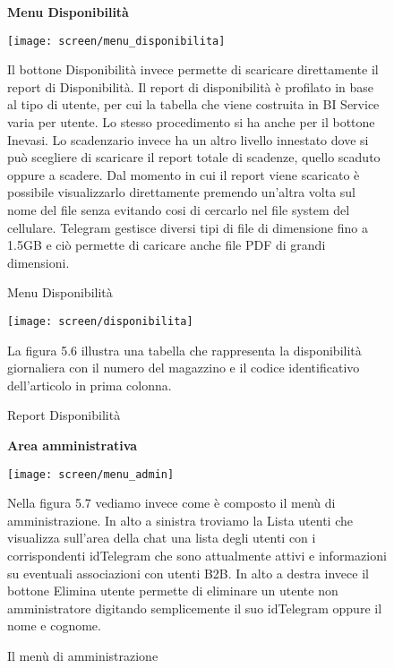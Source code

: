 \begin{figure}[h!]
\begin{center}
\textbf{Menu Disponibilità}
\end{center}
\begin{center}
    \texttt{[image: screen/menu\_disponibilita]} 
    \caption{Menu Disponibilità}
     \end{center}
    Il bottone Disponibilità invece permette di scaricare direttamente il report di Disponibilità. Il report di disponibilità è profilato in base al tipo di utente, per cui la tabella che viene costruita in BI Service varia per utente. Lo stesso procedimento si ha anche per il bottone Inevasi. Lo scadenzario invece ha un altro livello innestato dove si può scegliere di scaricare il report totale di scadenze, quello scaduto oppure a scadere. Dal momento in cui il report viene scaricato è possibile visualizzarlo direttamente premendo un'altra volta sul nome del file senza evitando cosi di cercarlo nel file system del cellulare. Telegram gestisce diversi tipi di file di dimensione fino a 1.5GB e ciò permette di caricare anche file PDF di grandi dimensioni. 
\end{figure}  


\begin{figure}[h!]
   
    \texttt{[image: screen/disponibilita]} 
    \caption{Report Disponibilità}
     La figura 5.6 illustra una tabella che rappresenta la disponibilità giornaliera con il numero del magazzino e il codice identificativo dell’articolo in prima colonna.
\end{figure}  


\begin{figure}[h!]
   \begin{center}
   \textbf{Area amministrativa}\\
   \end{center}
   \begin{center}
    \texttt{[image: screen/menu\_admin]} 
    \caption{Il menù di amministrazione}
    \end{center}
     Nella figura 5.7 vediamo invece come è composto il menù di amministrazione. In alto a sinistra troviamo la Lista utenti che visualizza sull'area della chat una lista degli utenti con i corrispondenti idTelegram che sono attualmente attivi e informazioni su eventuali associazioni con utenti B2B. In alto a destra invece il bottone Elimina utente permette di eliminare un utente non amministratore digitando semplicemente il suo idTelegram oppure il nome e cognome. 
\end{figure}  

